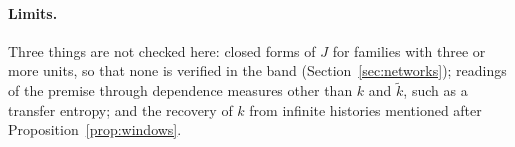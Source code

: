 \paragraph{Limits.} Three things are not checked here: closed forms of $J$ for families with three or more units, so that none is verified in the band (Section~\ref{sec:networks}); readings of the premise through dependence measures other than $k$ and $\tilde k$, such as a transfer entropy; and the recovery of $k$ from infinite histories mentioned after Proposition~\ref{prop:windows}.
